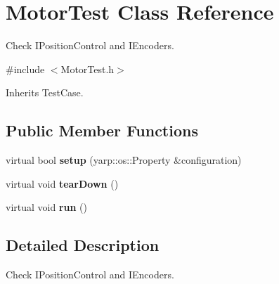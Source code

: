 \section{Motor\+Test Class Reference}
\label{classMotorTest}


Check I\+Position\+Control and I\+Encoders.  




{\ttfamily \#include $<$Motor\+Test.\+h$>$}



Inherits Test\+Case.

\subsection*{Public Member Functions}
\begin{DoxyCompactItemize}
\item 
\mbox{\label{classMotorTest_a899f7015f4c982fd25b0a2de4d693562}} 
virtual bool {\bfseries setup} (yarp\+::os\+::\+Property \&configuration)
\item 
\mbox{\label{classMotorTest_a35093fc16f2160699a962e2e600d12f7}} 
virtual void {\bfseries tear\+Down} ()
\item 
\mbox{\label{classMotorTest_a7f262c968aa26e60b2d654fa0f3b6d1a}} 
virtual void {\bfseries run} ()
\end{DoxyCompactItemize}


\subsection{Detailed Description}
Check I\+Position\+Control and I\+Encoders. 

